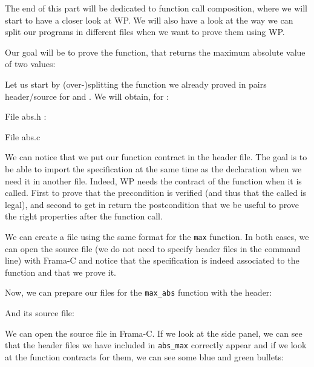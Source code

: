 The end of this part will be dedicated to function call composition,
where we will start to have a closer look at WP. We will also have a
look at the way we can split our programs in different files when we
want to prove them using WP.

Our goal will be to prove the  function, that returns
the maximum absolute value of two values:






Let us start by (over-)splitting the function we already proved in pairs
header/source for  and . We will obtain, for
:



File abs.h :




File abs.c




We can notice that we put our function contract in the header file.
The goal is to be able to import the specification at the same time as
the declaration when we need it in another file. Indeed, WP needs the
contract of the function when it is called. First to prove that the
precondition is verified (and thus that the called is legal), and second
to get in return the postcondition that we be useful to prove the right
properties after the function call.

We can create a file using the same format for the \texttt{max}
function. In both cases, we can open the source file (we do not need to
specify header files in the command line) with Frama-C and notice that
the specification is indeed associated to the function and that we prove
it.


Now, we can prepare our files for the \texttt{max\_abs} function with
the header:






And its source file:






We can open the source file in Frama-C. If we look at the side panel, we
can see that the header files we have included in \texttt{abs\_max}
correctly appear and if we look at the function contracts for them, we
can see some blue and green bullets:



